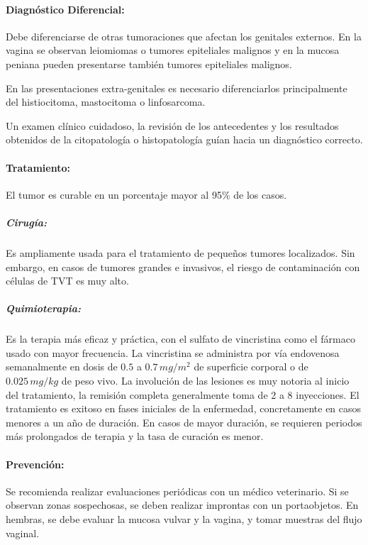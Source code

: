             \paragraph{Diagnóstico Diferencial:} Debe diferenciarse de otras tumoraciones que afectan los genitales externos. En la vagina se observan leiomiomas o tumores epiteliales malignos y en la mucosa peniana pueden presentarse también tumores epiteliales malignos.

            En las presentaciones extra-genitales es necesario diferenciarlos principalmente del histiocitoma, mastocitoma o linfosarcoma.

            Un examen clínico cuidadoso, la revisión de los antecedentes y los resultados obtenidos de la citopatología o histopatología guían hacia un diagnóstico correcto.

            \paragraph{Tratamiento:} El tumor es curable en un porcentaje mayor al 95\% de los casos.

            \subparagraph{Cirugía:} Es ampliamente usada para el tratamiento de pequeños tumores localizados. Sin embargo, en casos de tumores grandes e invasivos, el riesgo de contaminación con células de TVT es muy alto.

            \subparagraph{Quimioterapia:} Es la terapia más eficaz y práctica, con el sulfato de vincristina como el fármaco usado con mayor frecuencia. La vincristina se administra por vía endovenosa semanalmente en dosis de $0.5$ a $0.7\,mg/m^2$ de superficie corporal o de $0.025\,mg/kg$ de peso vivo. La involución de las lesiones es muy notoria al inicio del tratamiento, la remisión completa generalmente toma de 2 a 8 inyecciones. El tratamiento es exitoso en fases iniciales de la enfermedad, concretamente en casos menores a un año de duración. En casos de mayor duración, se requieren periodos más prolongados de terapia y la tasa de curación es menor.

            \paragraph{Prevención:} Se recomienda realizar evaluaciones periódicas con un médico veterinario. Si se observan zonas sospechosas, se deben realizar improntas con un portaobjetos. En hembras, se debe evaluar la mucosa vulvar y la vagina, y tomar muestras del flujo vaginal.

